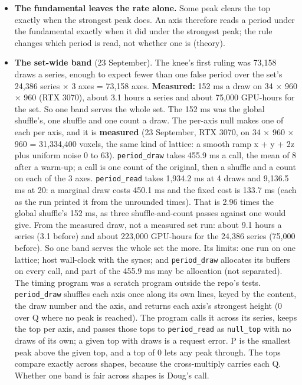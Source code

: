 \begin{itemize}
with each comparison a 128-bit cross-multiply. A period P also peaks at 2P and 3P with heights matching P's, and the strongest peak picked a multiple; the smallest peak above the top picks P. An empty band, where no draw reached a peak, or a given top of 0 lets any peak through, and the smallest peak is P. When none clears, P = 0 and the reported candidate is the strongest peak (the largest height, the smallest p on a tie). A lag that makes no peak at p and 2p is never a candidate. Nothing is rounded, and no constant is written in.
\item \textbf{The fundamental leaves the rate alone.} Some peak clears the top exactly when the strongest peak does. An axis therefore reads a period under the fundamental exactly when it did under the strongest peak; the rule changes which period is read, not whether one is (theory).
\item \textbf{The set-wide band} (23 September). The knee's first ruling was 73,158 draws a series, enough to expect fewer than one false period over the set's 24,386 series × 3 axes = 73,158 axes. \textbf{Measured:} 152 ms a draw on 34 × 960 × 960 (RTX 3070), about 3.1 hours a series and about 75,000 GPU-hours for the set. So one band serves the whole set. The 152 ms was the global shuffle's, one shuffle and one count a draw. The per-axis null makes one of each per axis, and it is \textbf{measured} (23 September, RTX 3070, on 34 × 960 × 960 = 31,334,400 voxels, the same kind of lattice: a smooth ramp x + y + 2z plus uniform noise 0 to 63). \texttt{period\_\allowbreak{}draw} takes 455.9 ms a call, the mean of 8 after a warm-up; a call is one count of the original, then a shuffle and a count on each of the 3 axes. \texttt{period\_\allowbreak{}read} takes 1,934.2 ms at 4 draws and 9,136.5 ms at 20: a marginal draw costs 450.1 ms and the fixed cost is 133.7 ms (each as the run printed it from the unrounded times). That is 2.96 times the global shuffle's 152 ms, as three shuffle-and-count passes against one would give. From the measured draw, not a measured set run: about 9.1 hours a series (3.1 before) and about 223,000 GPU-hours for the 24,386 series (75,000 before). So one band serves the whole set the more. Its limits: one run on one lattice; host wall-clock with the syncs; and \texttt{period\_\allowbreak{}draw} allocates its buffers on every call, and part of the 455.9 ms may be allocation (not separated). The timing program was a scratch program outside the repo's tests. \texttt{period\_\allowbreak{}draw} shuffles each axis once along its own lines, keyed by the content, the draw number and the axis, and returns each axis's strongest height (0 over Q where no peak is reached). The program calls it across its series, keeps the top per axis, and passes those tops to \texttt{period\_\allowbreak{}read} as \texttt{null\_\allowbreak{}top} with no draws of its own; a given top with draws is a request error. P is the smallest peak above the given top, and a top of 0 lets any peak through. The tops compare exactly across shapes, because the cross-multiply carries each Q. Whether one band is fair across shapes is Doug's call.

\end{itemize}
